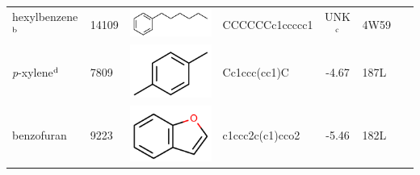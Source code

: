 \documentclass[aps,pre,twocolumn,nofootinbib,superscriptaddress,10pt, final,tightenlines]{revtex4-1}
\begin{document}
\begin{table}
\begin{center}
\begin{tabular}{llp{2cm}>{\ttfamily}lS[table-format=-1.2, table-figures-uncertainty=1]ll}
hexylbenzene$^{\rm b}$           & 14109                    &  \parbox[c]{1em}{\includegraphics[scale=0.2]{figures/14109.pdf}} & CCCCCCc1ccccc1         & {UNK$^{\rm c}$}                       & 4W59~\cite{merski_homologous_2015}                                      & \cite{morton_energetic_1995}                                 \\%
\emph{p}-xylene$^{\rm d}$        & 7809                     &  \parbox[c]{1em}{\includegraphics[scale=0.2]{figures/7809.pdf}}  & Cc1ccc(cc1)C           & -4.67                       & 187L~\cite{morton_specificity_1995}                                     & \cite{morton_energetic_1995}                                 \\%
benzofuran                       & 9223                    &  \parbox[c]{1em}{\includegraphics[scale=0.2]{figures/9223.pdf}}  & c1ccc2c(c1)cco2        & -5.46                       & 182L~\cite{morton_specificity_1995}                                     & \cite{morton_energetic_1995}                                 \\

\end{tabular}
\end{center}
\end{table}
\end{document}
